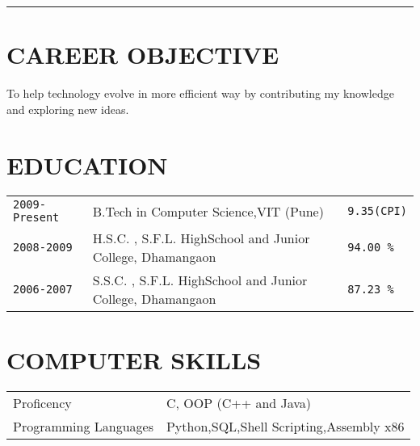 \documentclass{res}
\begin{document}
 


\address{\bf  
CONTACT DETAILS \\ 
Email : aakash.agrawal17@gmail.com\\
Phone : {\tt +91- 9503832567} }
\address{\bf POSTAL ADDRESS \\ Shivaji Nagar, \\ Dhamangaon(Rly) 444709 \\  (07222) 237209}

\begin{resume}
\rule{5.2in}{1pt}


\section{CAREER OBJECTIVE}          
    To help technology evolve in more efficient way by contributing my knowledge and exploring new ideas.           


\section{EDUCATION} 

	\begin{tabular}{l l l}
		{\tt 2009-Present} & B.Tech in Computer Science,VIT (Pune) & {\tt 9.35(CPI)}\\
		{\tt 2008-2009} & H.S.C. , S.F.L. HighSchool and Junior College, Dhamangaon & {\tt 94.00 \% }\\
		{\tt 2006-2007} & S.S.C. , S.F.L. HighSchool and Junior College, Dhamangaon & {\tt 87.23 \% }
	
	\end{tabular}         
    

\section{COMPUTER SKILLS}   
	\begin{tabular}{l l}
		Proficency & C, OOP (C++ and Java)\\

		Programming Languages &  Python,SQL,Shell Scripting,Assembly x86\\


\end{tabular}
\end{resume}
\end{document}
